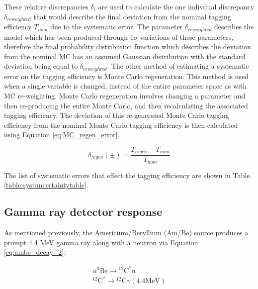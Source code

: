 These relative discrepancies $\delta_{i}$ are used to calculate the one indivdual discrepancy $\delta_{reweighted}$ that would describe the final deviation from the nominal tagging efficiency $T_{nom}$ due to the systematic error. The parameter $\delta_{reweighted}$ describes the model which has been produced through 1$\sigma$ variations of these parameters, therefore the final probability distribution function which describes the deviation from the nominal MC has an assumed Gaussian distribution with the standard deviation being equal to $\delta_{reweighted}$. 
\newline
The other method of estimating a systematic error on the tagging efficiency is Monte Carlo regeneration. This method is used when a single variable is changed, instead of the entire parameter space as with MC re-weighting. Monte Carlo regeneration involves changing a parameter and then re-producing the entire Monte Carlo, and then recalculating the associated tagging efficiency. The deviation of this re-generated Monte Carlo tagging efficiency from the nominal Monte Carlo tagging efficiency is then calculated using Equation \ref{eq:MC_regen_error}.

\begin{equation}
    \delta_{regen}(\pm)=\frac{T_{regen} -T_{n o m}}{T_{n o m}}
\label{eq:MC_regen_error}
\end{equation}

The list of systematic errors that effect the tagging efficiency are shown in Table \ref{table:systuncertaintytable}. 

\subsection{Gamma ray detector response}

As mentioned previously, the Americium/Beryllium (Am/Be) source produces a prompt 4.4 MeV gamma ray along with a neutron via Equation \ref{eq:ambe_decay_2}. 

\begin{equation}
    \begin{gathered}
    \alpha{ }^9 \mathrm{Be} \longrightarrow{ }^{12} \mathrm{C}^* \mathrm{n} \\
    { }^{12} \mathrm{C}^* \longrightarrow{ }^{12} \mathrm{C} \gamma(4.4 \mathrm{MeV})
    \end{gathered}
\label{eq:ambe_decay_2}
\end{equation}

